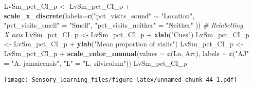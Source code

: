 \documentclass[]{article}
\newenvironment{Shaded}{\begin{snugshade}}{\end{snugshade}}
\newcommand{\KeywordTok}[1]{\textcolor[rgb]{0.13,0.29,0.53}{\textbf{{#1}}}}
\newcommand{\DataTypeTok}[1]{\textcolor[rgb]{0.13,0.29,0.53}{{#1}}}
\newcommand{\StringTok}[1]{\textcolor[rgb]{0.31,0.60,0.02}{{#1}}}
\newcommand{\CommentTok}[1]{\textcolor[rgb]{0.56,0.35,0.01}{\textit{{#1}}}}
\newcommand{\NormalTok}[1]{{#1}}
\begin{document}
\begin{Shaded}
\begin{Highlighting}[]
\NormalTok{LvSm_pct_CI_p <-}\StringTok{ }\NormalTok{LvSm_pct_CI_p +}\StringTok{ }\KeywordTok{scale_x_discrete}\NormalTok{(}\DataTypeTok{labels=}\KeywordTok{c}\NormalTok{(}\StringTok{"pct_visits_sound"} \NormalTok{=}\StringTok{ "Location"}\NormalTok{, }\StringTok{"pct_visits_smell"} \NormalTok{=}\StringTok{ "Smell"}\NormalTok{,}
                              \StringTok{"pct_visits_neither"} \NormalTok{=}\StringTok{ "Neither"} \NormalTok{))  }\CommentTok{# Relabelling X axis}
\NormalTok{LvSm_pct_CI_p <-}\StringTok{ }\NormalTok{LvSm_pct_CI_p +}\StringTok{ }\KeywordTok{xlab}\NormalTok{(}\StringTok{"Cues"}\NormalTok{)}
\NormalTok{LvSm_pct_CI_p <-}\StringTok{ }\NormalTok{LvSm_pct_CI_p +}\StringTok{ }\KeywordTok{ylab}\NormalTok{(}\StringTok{"Mean proportion of visits"}\NormalTok{)}
\NormalTok{LvSm_pct_CI_p <-}\StringTok{ }\NormalTok{LvSm_pct_CI_p +}\StringTok{ }\KeywordTok{scale_color_manual}\NormalTok{(}\DataTypeTok{values =} \KeywordTok{c}\NormalTok{(Lo, Art), }\DataTypeTok{labels =} \KeywordTok{c}\NormalTok{(}\StringTok{"AJ"} \NormalTok{=}\StringTok{ "A. jamaicensis"}\NormalTok{, }\StringTok{"L"} \NormalTok{=}\StringTok{ "L. silvicolum"}\NormalTok{))}
\NormalTok{LvSm_pct_CI_p                    }
\end{Highlighting}
\end{Shaded}

\texttt{[image: Sensory\_learning\_files/figure-latex/unnamed-chunk-44-1.pdf]}
\end{document}
